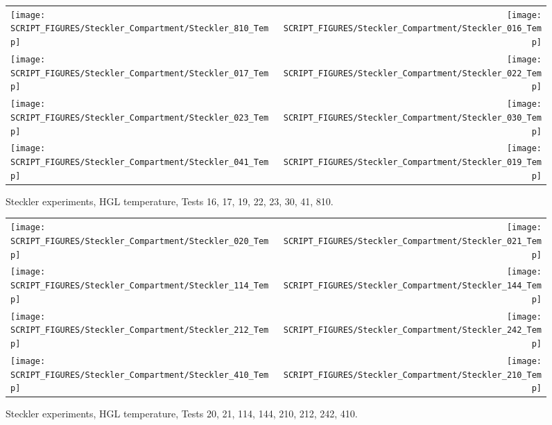 \begin{figure}[p]
\begin{tabular*}{\textwidth}{l@{\extracolsep{\fill}}r}
\texttt{[image: SCRIPT\_FIGURES/Steckler\_Compartment/Steckler\_810\_Temp]} &
\texttt{[image: SCRIPT\_FIGURES/Steckler\_Compartment/Steckler\_016\_Temp]} \\
\texttt{[image: SCRIPT\_FIGURES/Steckler\_Compartment/Steckler\_017\_Temp]} &
\texttt{[image: SCRIPT\_FIGURES/Steckler\_Compartment/Steckler\_022\_Temp]} \\
\texttt{[image: SCRIPT\_FIGURES/Steckler\_Compartment/Steckler\_023\_Temp]} &
\texttt{[image: SCRIPT\_FIGURES/Steckler\_Compartment/Steckler\_030\_Temp]} \\
\texttt{[image: SCRIPT\_FIGURES/Steckler\_Compartment/Steckler\_041\_Temp]} &
\texttt{[image: SCRIPT\_FIGURES/Steckler\_Compartment/Steckler\_019\_Temp]}
\end{tabular*}
\caption[Steckler experiments, HGL temperature, Tests 16, 17, 19, 22, 23, 30, 41, 810]
{Steckler experiments, HGL temperature, Tests 16, 17, 19, 22, 23, 30, 41, 810.}
\label{Steckler_Temp_2}
\end{figure}

\begin{figure}[p]
\begin{tabular*}{\textwidth}{l@{\extracolsep{\fill}}r}
\texttt{[image: SCRIPT\_FIGURES/Steckler\_Compartment/Steckler\_020\_Temp]} &
\texttt{[image: SCRIPT\_FIGURES/Steckler\_Compartment/Steckler\_021\_Temp]} \\
\texttt{[image: SCRIPT\_FIGURES/Steckler\_Compartment/Steckler\_114\_Temp]} &
\texttt{[image: SCRIPT\_FIGURES/Steckler\_Compartment/Steckler\_144\_Temp]} \\
\texttt{[image: SCRIPT\_FIGURES/Steckler\_Compartment/Steckler\_212\_Temp]} &
\texttt{[image: SCRIPT\_FIGURES/Steckler\_Compartment/Steckler\_242\_Temp]} \\
\texttt{[image: SCRIPT\_FIGURES/Steckler\_Compartment/Steckler\_410\_Temp]} &
\texttt{[image: SCRIPT\_FIGURES/Steckler\_Compartment/Steckler\_210\_Temp]}
\end{tabular*}
\caption[Steckler experiments, HGL temperature, Tests 20, 21, 114, 144, 210, 212, 242, 410]
{Steckler experiments, HGL temperature, Tests 20, 21, 114, 144, 210, 212, 242, 410.}
\label{Steckler_Temp_3}
\end{figure}

